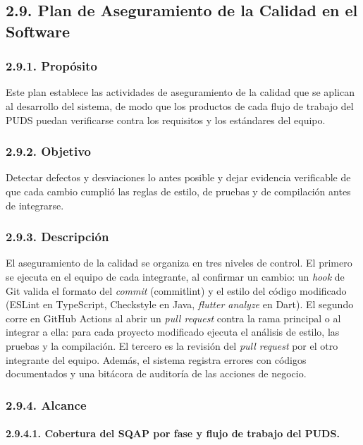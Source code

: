 \subsection{2.9. Plan de Aseguramiento de la Calidad en el Software}

\subsubsection{2.9.1. Propósito}

Este plan establece las actividades de aseguramiento de la calidad que se aplican al desarrollo del sistema, de modo que los productos de cada flujo de trabajo del PUDS puedan verificarse contra los requisitos y los estándares del equipo.

\subsubsection{2.9.2. Objetivo}

Detectar defectos y desviaciones lo antes posible y dejar evidencia verificable de que cada cambio cumplió las reglas de estilo, de pruebas y de compilación antes de integrarse.

\subsubsection{2.9.3. Descripción}

El aseguramiento de la calidad se organiza en tres niveles de control. El primero se ejecuta en el equipo de cada integrante, al confirmar un cambio: un \textit{hook} de Git valida el formato del \textit{commit} (commitlint) y el estilo del código modificado (ESLint en TypeScript, Checkstyle en Java, \textit{flutter analyze} en Dart). El segundo corre en GitHub Actions al abrir un \textit{pull request} contra la rama principal o al integrar a ella: para cada proyecto modificado ejecuta el análisis de estilo, las pruebas y la compilación. El tercero es la revisión del \textit{pull request} por el otro integrante del equipo. Además, el sistema registra errores con códigos documentados y una bitácora de auditoría de las acciones de negocio.

\subsubsection{2.9.4. Alcance}

\paragraph{2.9.4.1. Cobertura del SQAP por fase y flujo de trabajo del PUDS.}

